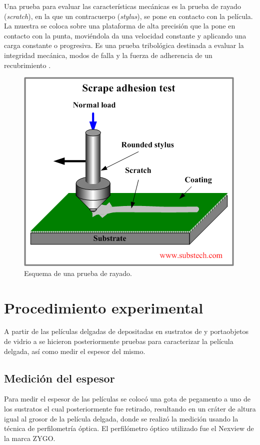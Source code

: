 \documentclass[12pt]{IEEEtran}
\begin{document}
Una prueba para evaluar las características mecánicas es la prueba de rayado (\emph{scratch}), en la que un contracuerpo (\emph{stylus}), se pone en contacto con la película. La muestra se coloca sobre una plataforma de alta precisión que la pone en contacto con la punta, moviéndola da una velocidad constante y aplicando una carga constante o progresiva. Es una prueba tribológica destinada a evaluar la integridad mecánica, modos de falla y la fuerza de adherencia de un recubrimiento \cite{internationalStandardTestMethod}.

\begin{figure}[htp]
    \centering
    \includegraphics[width=0.8\linewidth]{scratch-test}
    \caption{Esquema de una prueba de rayado. \cite{kopeliovich_adhesion_nodate}}
    \label{fig:scratch-test}
\end{figure}

\section{Procedimiento experimental}

A partir de las películas delgadas de  depositadas en sustratos de  y portaobjetos de vidrio a 
se hicieron posteriormente pruebas para caracterizar la película delgada, así como medir el espesor del mismo.

\subsection{Medición del espesor}

Para medir el espesor de las películas se colocó una gota de pegamento a uno de los sustratos el cual posteriormente fue retirado, resultando en un cráter de altura igual al grosor de la película delgada, donde se realizó la medición usando la técnica de perfilometría óptica. El perfilómetro óptico utilizado fue el Nexview de la marca ZYGO. 
\end{document}

